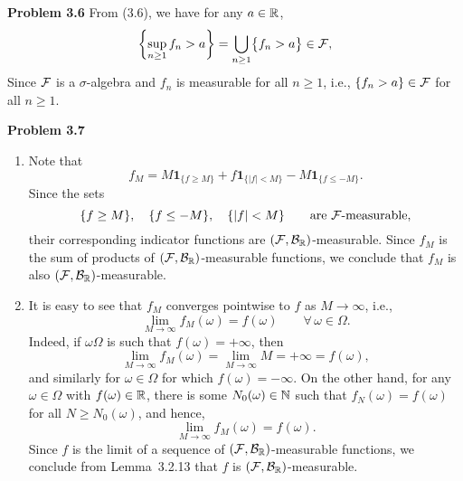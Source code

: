 \bigskip

\textbf{Problem 3.6} 
From (3.6), we have for any $a\in\mathbb R$,
\[
	\left\{ \sup_{n\ge 1} f_n>a\right\} = \bigcup_{n\ge 1} \bigl\{ f_n>a\bigr\}\in\mathcal F,
\]
Since $\mathcal F$ is a $\sigma$-algebra and $f_n$ is measurable for all $n\ge 1$, i.e., $\{f_n>a\}\in\mathcal F$ for all $n\ge 1$.


\bigskip

\textbf{Problem 3.7}

\begin{enumerate}[label=(\alph*)]
	\item Note that
	\[
		f_M = M\mathbf{1}_{\{f\ge M\}} + f\mathbf{1}_{\{|f|< M\}} - M\mathbf{1}_{\{f\le -M\}}.
	\]
	Since the sets
	\[
		\{f\ge M\},\quad \{f\le -M\},\quad \{|f|<M\}\qquad\text{are $\mathcal F$-measurable},
	\]
	their corresponding indicator functions are $(\mathcal F,\mathcal B_{\mathbb R})$-measurable. Since $f_M$ is the sum of products of $(\mathcal F,\mathcal B_{\mathbb R})$-measurable functions, we conclude that $f_M$ is also $(\mathcal F,\mathcal B_{\mathbb R})$-measurable.
	
	\item It is easy to see that $f_M$ converges pointwise to $f$ as $M\to\infty$, i.e.,
	\[
		\lim_{M\to\infty} f_M(\omega) = f(\omega)\qquad\forall\, \omega\in\Omega.
	\]
	Indeed, if $\omega\Omega$ is such that $f(\omega)=+\infty$, then
	\[
		\lim_{M\to\infty} f_M(\omega) = \lim_{M\to\infty} M = +\infty = f(\omega),
	\]
	and similarly for $\omega\in\Omega$ for which $f(\omega)=-\infty$. On the other hand, for any $\omega\in\Omega$ with $f(\omega)\in\mathbb R$, there is some $N_0(\omega)\in\mathbb N$ such that $f_N(\omega)=f(\omega)$ for all $N\ge N_0(\omega)$, and hence,
	\[
		\lim_{M\to\infty} f_M(\omega) = f(\omega).
	\]
	Since $f$ is the limit of a sequence of $(\mathcal F,\mathcal B_{\mathbb R})$-measurable functions, we conclude from Lemma~3.2.13 that $f$ is $(\mathcal F,\mathcal B_{\mathbb R})$-measurable.
\end{enumerate}



